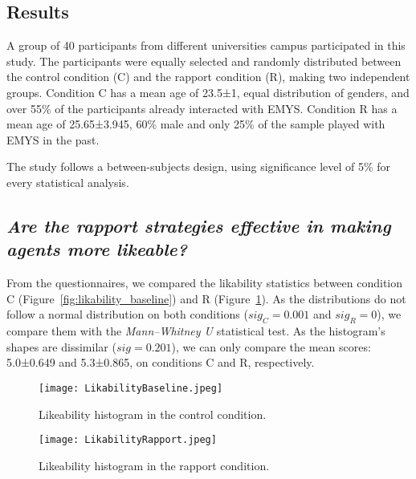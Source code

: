 \subsection{Results}
\label{sec:results}

A group of 40 participants from different universities campus participated in this study. The participants were equally selected and randomly distributed between the control condition (C) and the rapport condition (R), making two independent groups. Condition C has a mean age of 23.5±1, equal distribution of genders, and over 55\% of the participants already interacted with \ac{EMYS}. Condition R has a mean age of 25.65±3.945, 60\% male and only 25\% of the sample played with \ac{EMYS} in the past.

The study follows a between-subjects design, using significance level of 5\% for every statistical analysis.

\subsection*{\textbf{\textit{Are the rapport strategies effective in making agents more likeable?}}}

From the questionnaires, we compared the likability statistics between condition C (Figure~\ref{fig:likability_baseline}) and R (Figure~\ref{fig:likability_rapport}). As the distributions do not follow a normal distribution on both conditions ($sig_C=0.001$ and $sig_R=0$), we compare them with the \textit{Mann–Whitney U} statistical test. As the histogram's shapes are dissimilar ($sig=0.201$), we can only compare the mean scores: 5.0±0.649 and 5.3±0.865, on conditions C and R, respectively.

\begin{figure}[ht]
	\centering
	\begin{minipage}[b]{.2\textwidth}
		\centering
		\texttt{[image: LikabilityBaseline.jpeg]}
		\caption{Likeability histogram in the control condition.}
		\label{fig:likability_baseline}
	\end{minipage}
	\hspace{2mm}
	\begin{minipage}[b]{.2\textwidth}
		\centering
		\texttt{[image: LikabilityRapport.jpeg]}
		\caption{Likeability histogram in the rapport condition.}
		\label{fig:likability_rapport}
	\end{minipage}
\end{figure}



